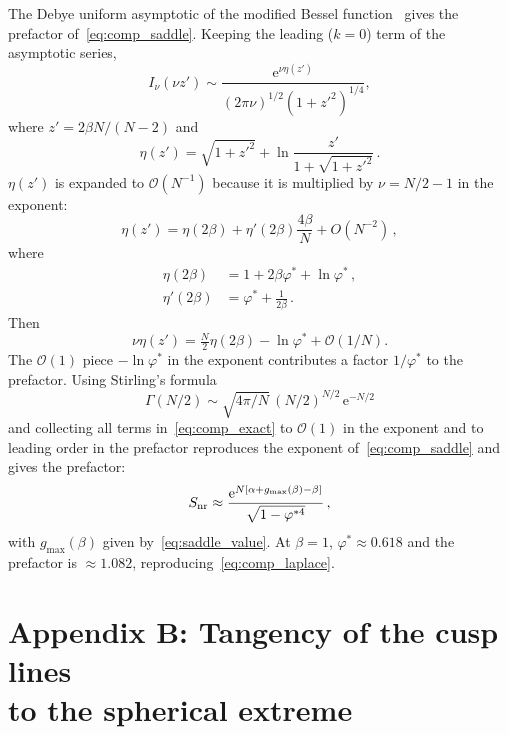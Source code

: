 \documentclass[letterpaper]{article} %
\newcommand{\e}{{\mathrm{e}}}
\newcommand{\Bnet}{\beta}
\begin{document}
The Debye uniform asymptotic of the modified Bessel function~\citep[10.41.3]{olver2010nist}
gives the prefactor of~\eqref{eq:comp_saddle}. Keeping the leading ($k = 0$) term of
the asymptotic series,
\begin{equation}
I_\nu(\nu z') \sim \frac{\e^{\nu\eta(z')}}{(2\pi\nu)^{1/2}(1+{z'}^2)^{1/4}},
\end{equation}
where $z' = 2\Bnet N/(N-2)$ and
\begin{equation}
    \eta(z') = \sqrt{1+{z'}^2} + \ln\frac{z'}{1+\sqrt{1+{z'}^2}}\,.
    \label{eq:bessel_debye}
\end{equation}  
$\eta(z')$ is expanded to $\mathcal{O}(N^{-1})$ because it is multiplied by
$\nu = N/2 - 1$ in the exponent:
\begin{equation}
    \eta(z') = \eta(2\Bnet) + \eta'(2\Bnet) \frac{4\Bnet}{N} + O(N^{-2})\,,
\end{equation}
where
\begin{align}
    \eta(2\Bnet)  &= 1 + 2\Bnet\varphi^* + \ln\varphi^*\,, \\
    \eta'(2\Bnet) &= \varphi^* + \frac{1}{2\Bnet}\,.
\end{align}
Then 
\begin{equation}
    \nu \eta(z') = \tfrac{N}{2} \eta(2\Bnet) - \ln\varphi^* + \mathcal{O}(1/N).
\end{equation}
The $\mathcal{O}(1)$ piece $-\ln\varphi^*$ in the exponent contributes a factor
$1/\varphi^*$ to the prefactor. Using Stirling's formula
\begin{equation}
    \Gamma(N/2) \sim \sqrt{4\pi/N}\,(N/2)^{N/2}\,\e^{-N/2}
\end{equation} 
and collecting all terms in~\eqref{eq:comp_exact} to $\mathcal{O}(1)$ in the
exponent and to leading order in the prefactor reproduces the exponent
of~\eqref{eq:comp_saddle} and gives the prefactor:
\begin{equation}
S_{\rm nr} \approx \frac{\e^{N[\alpha + g_{\max}(\Bnet) - \Bnet]}}{\sqrt{1-\varphi^{*4}}}\,,
\end{equation}
with $g_{\max}(\Bnet)$ given by~\eqref{eq:saddle_value}.
At $\Bnet = 1$, $\varphi^* \approx 0.618$ and the prefactor is $\approx 1.082$, reproducing~\eqref{eq:comp_laplace}.


\section{Appendix B: Tangency of the cusp lines \\to the spherical extreme}
\end{document}
